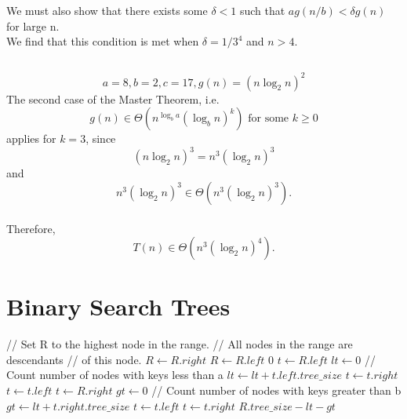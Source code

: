 \documentclass{article}
\begin{document}
	We must also show that there exists some $\delta{}<1$ such that $ag(n/b)<\delta{}g(n)$ for large n.\\
	We find that this condition is met when $\delta=1/3^4$ and $n>4$.
\subsection{}
	\[a=8, b=2, c=17, g(n)={(n\log_2{n})}^2\]
	The second case of the Master Theorem, i.e.
	\[g(n)\in{}\Theta(n^{\log_b{a}}{(\log_b{n})}^k)\textrm{ for some } k\ge0\]
	applies for $k=3$, since
	\[{(n\log_2{n})}^3=n^3{(\log_2{n})}^3\]
	and
	\[n^3{(\log_2{n})}^3\in\Theta(n^3{(\log_2{n})}^3).\]
	\\
	Therefore,
	\[T(n)\in\Theta(n^3{(\log_2{n})}^4).\]
\newpage
\section{Binary Search Trees}
	\begin{algorithmic}[1]
		\State{} // Set R to the highest node in the range.
		\State{} // All nodes in the range are descendants
		\State{} // of this node.
				\State{} $R \gets{} R.right$
				\State{} $R \gets{} R.left$
			\Else{}
				\State{} \Return{} $0$
			\EndIf{}
		\EndWhile{}
		\State{} $t \gets{} R.left$
		\State{} $lt \gets{} 0$ // Count number of nodes with keys less than a
				\State{} $lt \gets{} lt+t.left.tree\_size$
				\State{} $t \gets{} t.right$
			\Else{}
				\State{} $t \gets{} t.left$
			\EndIf{}
		\EndWhile{}
		\State{} $t \gets{} R.right$
		\State{} $gt \gets{} 0$ // Count number of nodes with keys greater than b
				\State{} $gt \gets{} lt+t.right.tree\_size$
				\State{} $t \gets{} t.left$
			\Else{}
				\State{} $t \gets{} t.right$
			\EndIf{}
		\EndWhile{}
		\State{} \Return{} $R.tree\_size-lt-gt$
		\EndFunction{}
	\end{algorithmic}
\end{document}
